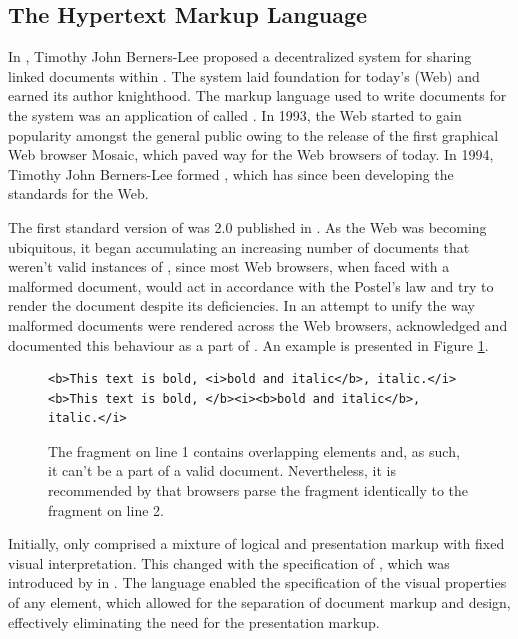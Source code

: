 \documentclass{book}
\begin{document}
\subsection{The Hypertext Markup Language}
In \cite{bernerslee89}, Timothy John Berners-Lee proposed a decentralized system
for sharing linked documents within . The system laid foundation
for today's  (Web) and earned its author knighthood.
The markup language used to write documents for the system was an application of
 called . In 1993, the Web started to gain
popularity amongst the general public owing to the release of the first
graphical Web browser Mosaic, which paved way for the Web browsers of today. In
1994, Timothy John Berners-Lee formed , which has since been
developing the standards for the Web.

The first standard version of  was  2.0 published in
\cite{rfc1866}. As the Web was becoming ubiquitous, it began accumulating an
increasing number of documents that weren't valid instances of ,
since most Web browsers, when faced with a malformed document, would act in
accordance with the Postel's law and try to render the document despite its
deficiencies. In an attempt to unify the way malformed  documents
were rendered across the Web browsers,  acknowledged and documented
this behaviour as a part of \cite[Section~8.2, Parsing HTML
documents]{hickson14}. An example is presented in Figure
\ref{fig:overlapping-elements}.

\begin{figure}[b]
  \begin{verbatim}
<b>This text is bold, <i>bold and italic</b>, italic.</i>
<b>This text is bold, </b><i><b>bold and italic</b>, italic.</i>
  \end{verbatim}
  \caption{The fragment on line 1 contains overlapping elements and, as such, it
    can't be a part of a valid  document. Nevertheless, it is
    recommended by  that browsers parse the fragment identically to
    the fragment on line 2.}
  \label{fig:overlapping-elements}
\end{figure}

Initially,  only comprised a mixture of logical and presentation
markup with fixed visual interpretation. This changed with the specification of
, which was introduced by  in \cite{lie96}. The
language enabled the specification of the visual properties of any element,
which allowed for the separation of document markup and design, effectively
eliminating the need for the presentation markup.
\end{document}
